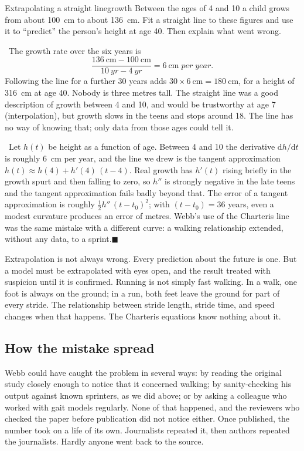 \documentclass[11pt,twoside,openany]{book}
\newcommand{\dd}{\mathrm{d}}
\newcounter{check}[chapter]
\newcommand{\viewtag}[3]{\fcolorbox{#2}{#3}{\footnotesize\textbf{\textcolor{#2}{#1}}}}
\newcommand{\elemtag}{\viewtag{Elementary}{elemcol}{elempale}}
\newcommand{\calctag}{\viewtag{Calculus}{calccol}{calcpale}}
\newcommand{\elem}{\par\medskip\noindent\elemtag\ }
\newcommand{\calc}{\par\medskip\noindent\calctag\ }
\newcommand{\qed}{\hfill$\blacksquare$}
\begin{document}
\begin{example}{Extrapolating a straight line}{growth}
Between the ages of 4 and 10 a child grows from about \SI{100}{\centi\metre} to about \SI{136}{\centi\metre}. Fit a straight line to these figures and use it to ``predict'' the person's height at age 40. Then explain what went wrong.

\elem The growth rate over the six years is
\[
\frac{\SI{136}{\centi\metre} - \SI{100}{\centi\metre}}{\SI{10}{yr} - \SI{4}{yr}} = \SI{6}{\centi\metre\;per\;year}.
\]
Following the line for a further 30 years adds $30 \times \SI{6}{\centi\metre} = \SI{180}{\centi\metre}$, for a height of \SI{316}{\centi\metre} at age 40. Nobody is three metres tall. The straight line was a good description of growth between 4 and 10, and would be trustworthy at age 7 (interpolation), but growth slows in the teens and stops around 18. The line has no way of knowing that; only data from those ages could tell it.

\calc Let $h(t)$ be height as a function of age. Between 4 and 10 the derivative $\dd h/\dd t$ is roughly \SI{6}{\centi\metre} per year, and the line we drew is the tangent approximation $h(t) \approx h(4) + h'(4)\,(t - 4)$. Real growth has $h'(t)$ rising briefly in the growth spurt and then falling to zero, so $h''$ is strongly negative in the late teens and the tangent approximation fails badly beyond that. The error of a tangent approximation is roughly $\tfrac12 h''\,(t - t_0)^2$; with $(t - t_0) = 36$ years, even a modest curvature produces an error of metres. Webb's use of the Charteris line was the same mistake with a different curve: a walking relationship extended, without any data, to a sprint.\qed
\end{example}

Extrapolation is not always wrong. Every prediction about the future is one. But a model must be extrapolated with eyes open, and the result treated with suspicion until it is confirmed. Running is not simply fast walking. In a walk, one foot is always on the ground; in a run, both feet leave the ground for part of every stride. The relationship between stride length, stride time, and speed changes when that happens. The Charteris equations know nothing about it.

\subsection{How the mistake spread}

Webb could have caught the problem in several ways: by reading the original study closely enough to notice that it concerned walking; by sanity-checking his output against known sprinters, as we did above; or by asking a colleague who worked with gait models regularly. None of that happened, and the reviewers who checked the paper before publication did not notice either. Once published, the number took on a life of its own. Journalists repeated it, then authors repeated the journalists. Hardly anyone went back to the source.
\end{document}
